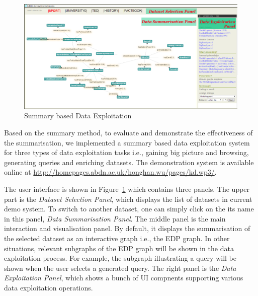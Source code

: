 \begin{figure}
\begin{center}
\includegraphics[scale=0.30]{figures/ui_general_annotated.png}
\caption{Summary based Data Exploitation}\label{fig:ui}
\end{center}
\end{figure}

Based on the summary method, to evaluate and demonstrate the effectiveness of the summarisation, we implemented a summary based data exploitation system for three types of data exploitation tasks i.e., gaining big picture and browsing, generating queries and enriching datasets. The demonstration system is available online at \url{http://homepages.abdn.ac.uk/honghan.wu/pages/kd.wp3/}.

The user interface is shown in Figure~\ref{fig:ui} which contains three panels. The upper part is the \emph{Dataset Selection Panel}, which displays the list of datasets in current demo system. To switch to another dataset, one can simply click on the its name in this panel, \emph{Data Summarisation Panel}. The middle panel is the main interaction and visualisation panel. By default, it displays the summarisation of the selected dataset as an interactive graph i.e., the EDP graph. In other situations, relevant subgraphs of the EDP graph will be shown in the data exploitation process. For example, the subgraph illustrating a query will be shown when the user selects a generated query. The right panel is the \emph{Data Exploitation Panel}, which shows a bunch of UI compnents supporting various data exploitation operations.

